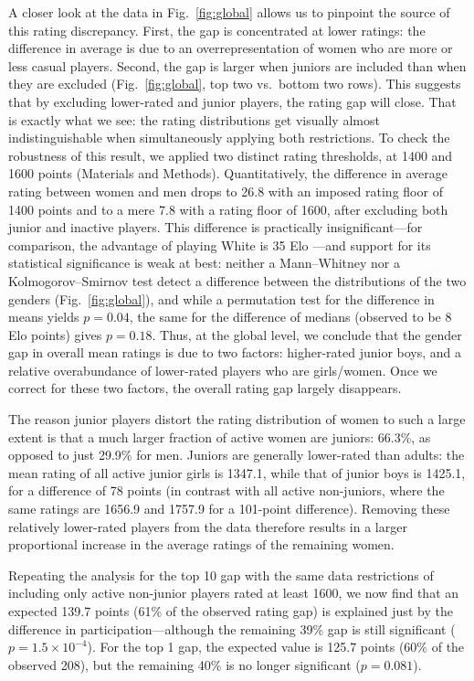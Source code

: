 \documentclass[9pt,twocolumn,twoside,lineno]{pnas-new}
\newcommand{\MM}{Materials and Methods}
\begin{document}
A closer look at the data in Fig.~\ref{fig:global} allows us to pinpoint the source of this rating discrepancy. First, the gap is concentrated at lower ratings: the difference in average is due to an overrepresentation of women who are more or less casual players. Second, the gap is larger when juniors are included than when they are excluded (Fig.~\ref{fig:global}, top two vs.~bottom two rows). This suggests that by excluding lower-rated and junior players, the rating gap will close. That is exactly what we see: the rating distributions get visually almost indistinguishable when simultaneously applying both restrictions. To check the robustness of this result, we applied two distinct rating thresholds, at 1400 and 1600 points (\MM). Quantitatively, the difference in average rating between women and men drops to 26.8 with an imposed rating floor of 1400 points and to a mere 7.8 with a rating floor of 1600, after excluding both junior and inactive players. This difference is practically insignificant---for comparison, the advantage of playing White is 35 Elo \citep{berg2020statistical}---and support for its statistical significance is weak at best: neither a Mann--Whitney nor a Kolmogorov--Smirnov test detect a difference between the distributions of the two genders (Fig.~\ref{fig:global}), and while a permutation test for the difference in means yields $p = 0.04$, the same for the difference of medians (observed to be 8 Elo points) gives $p=0.18$. Thus, at the global level, we conclude that the gender gap in overall mean ratings is due to two factors: higher-rated junior boys, and a relative overabundance of lower-rated players who are girls/women. Once we correct for these two factors, the overall rating gap largely disappears.

The reason junior players distort the rating distribution of women to such a large extent is that a much larger fraction of active women are juniors: 66.3\%, as opposed to just 29.9\% for men. Juniors are generally lower-rated than adults: the mean rating of all active junior girls is 1347.1, while that of junior boys is 1425.1, for a difference of 78 points (in contrast with all active non-juniors, where the same ratings are 1656.9 and 1757.9 for a 101-point difference). Removing these relatively lower-rated players from the data therefore results in a larger proportional increase in the average ratings of the remaining women.

Repeating the analysis for the top 10 gap with the same data restrictions of including only active non-junior players rated at least 1600, we now find that an expected 139.7 points (61\% of the observed rating gap) is explained just by the difference in participation---although the remaining 39\% gap is still significant ($p = 1.5\times 10^{-4}$). For the top 1 gap, the expected value is 125.7 points (60\% of the observed 208), but the remaining 40\% is no longer significant ($p = 0.081$).
\end{document}
